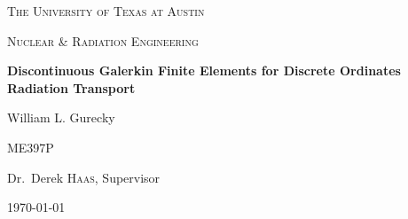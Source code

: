 
\begin{titlepage}
	\centering
	{\scshape\LARGE The University of Texas at Austin \par}
	\vspace{1cm}
	{\scshape\Large Nuclear \& Radiation Engineering \par}
	\vspace{1.5cm}
	{\huge\bfseries Discontinuous Galerkin Finite Elements for Discrete Ordinates Radiation Transport \par}
	\vspace{2cm}
	{\Large William L. Gurecky \par}
	\vfill

	\begin{flushright}
	ME397P \par
	\bigskip
	Dr.~Derek \textsc{Haas}, Supervisor \par
        \date{\today}
	\end{flushright}
	\vfill
	{\large \today\par}
\end{titlepage}
\pagebreak
\tableofcontents
\pagebreak
